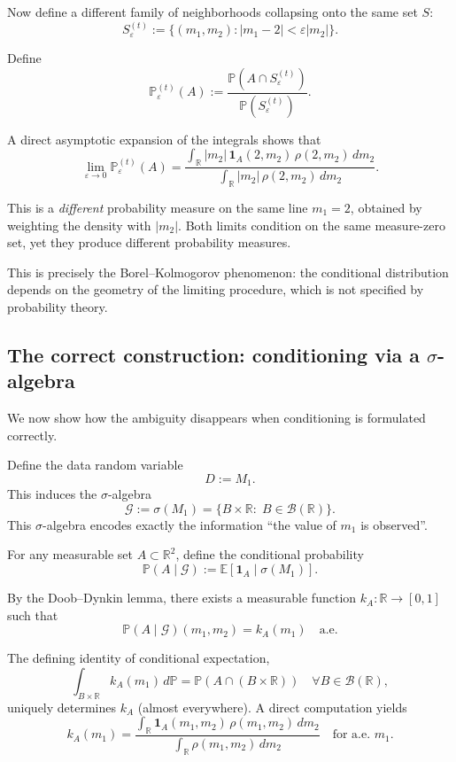 \documentclass[11pt]{article}
\theoremstyle{remark}
\begin{document}
Now define a different family of neighborhoods collapsing onto the same set $S$:
\[
S^{(t)}_\varepsilon
:=
\bigl\{(m_1,m_2): |m_1-2| < \varepsilon |m_2| \bigr\}.
\]

Define
\[
\mathbb P^{(t)}_\varepsilon(A)
:=
\frac{\mathbb P(A\cap S^{(t)}_\varepsilon)}
{\mathbb P(S^{(t)}_\varepsilon)}.
\]

A direct asymptotic expansion of the integrals shows that
\[
\lim_{\varepsilon\to 0}\mathbb P^{(t)}_\varepsilon(A)
=
\frac{
\displaystyle\int_{\mathbb R}
|m_2|\,\mathbf 1_A(2,m_2)\,\rho(2,m_2)\,dm_2
}{
\displaystyle\int_{\mathbb R}
|m_2|\,\rho(2,m_2)\,dm_2
}.
\]

This is a \emph{different} probability measure on the same line $m_1=2$, obtained
by weighting the density with $|m_2|$.
Both limits condition on the same measure-zero set, yet they produce different
probability measures.

This is precisely the Borel--Kolmogorov phenomenon: the conditional distribution
depends on the geometry of the limiting procedure, which is not specified by
probability theory.

\subsection{The correct construction: conditioning via a $\sigma$-algebra}

We now show how the ambiguity disappears when conditioning is formulated correctly.

Define the data random variable
\[
D := M_1.
\]
This induces the $\sigma$-algebra
\[
\mathcal G := \sigma(M_1)
=
\{B\times\mathbb R:\;B\in\mathcal B(\mathbb R)\}.
\]
This $\sigma$-algebra encodes exactly the information ``the value of $m_1$ is
observed''.

For any measurable set $A\subset\mathbb R^2$, define the conditional probability
\[
\mathbb P(A\mid\mathcal G)
:=
\mathbb E[\mathbf 1_A\mid\sigma(M_1)].
\]

By the Doob--Dynkin lemma, there exists a measurable function $k_A:\mathbb R\to[0,1]$
such that
\[
\mathbb P(A\mid\mathcal G)(m_1,m_2) = k_A(m_1)
\quad\text{a.e.}
\]

The defining identity of conditional expectation,
\[
\int_{B\times\mathbb R} k_A(m_1)\,d\mathbb P
=
\mathbb P(A\cap(B\times\mathbb R))
\quad\forall B\in\mathcal B(\mathbb R),
\]
uniquely determines $k_A$ (almost everywhere). A direct computation yields
\[
k_A(m_1)
=
\frac{
\displaystyle\int_{\mathbb R}
\mathbf 1_A(m_1,m_2)\,\rho(m_1,m_2)\,dm_2
}{
\displaystyle\int_{\mathbb R}
\rho(m_1,m_2)\,dm_2
}
\quad\text{for a.e. } m_1.
\]
\end{document}
